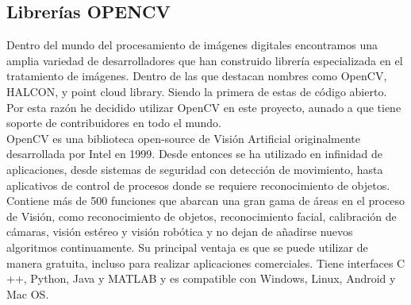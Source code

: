 \subsection{Librerías OPENCV}
Dentro del mundo del procesamiento de imágenes digitales encontramos una amplia variedad
de desarrolladores que han construido librería especializada en el tratamiento de
imágenes. Dentro de las que destacan nombres como OpenCV, HALCON, y point cloud library.
Siendo la primera de estas de código abierto. Por esta razón he decidido utilizar
OpenCV en este proyecto, aunado a que tiene soporte de contribuidores en todo el mundo.\\
OpenCV es una biblioteca open-source de Visión Artificial originalmente desarrollada por
Intel en 1999. Desde entonces se ha utilizado en infinidad de aplicaciones, desde
sistemas de seguridad con detección de movimiento, hasta aplicativos de control de
procesos donde se requiere reconocimiento de objetos. Contiene más de 500 funciones
que abarcan una gran gama de áreas en el proceso de Visión, como reconocimiento de
objetos, reconocimiento facial, calibración de cámaras, visión estéreo y visión
robótica y no dejan de añadirse nuevos algoritmos continuamente. Su principal ventaja
es que se puede utilizar de manera gratuita, incluso para realizar aplicaciones
comerciales.\cite{WEB:Opencv}
Tiene interfaces C ++, Python, Java y MATLAB y es compatible con Windows, Linux,
Android y Mac OS.

